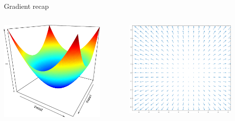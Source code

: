 \documentclass[ignorenonframetext,]{beamer}
\begin{document}
\begin{frame}{Gradient recap}
\begin{columns}
\begin{column}{0.48\textwidth}
\begin{center}\includegraphics[width=1\linewidth]{lecture3_files/figure-beamer/unnamed-chunk-5-1} \end{center}
    \end{column}
    \begin{column}{0.48\textwidth}
      \begin{figure}
    \centering
    \includegraphics[width = \textwidth]{./gradvecfield.eps}
\end{figure}
    \end{column}
\end{columns}

\end{frame}
\end{document}
